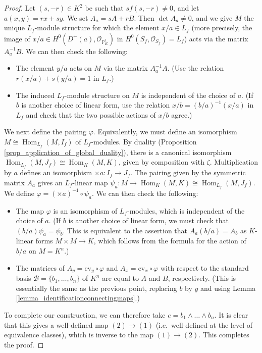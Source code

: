 \documentclass{article} %
\numberwithin{equation}{section}
\DeclareMathOperator{\Hom}{Hom}
\newcommand{\bbP}{\mathbb{P}}
\newcommand{\cO}{\mathcal{O}}
\begin{document}
\begin{proof}
    Let $(s, -r) \in K^2$ be such that $s f(s, -r) \neq 0$, and let $a(x, y) = r x + s y$.  We set $A_a = s A + r B$. Then $\det A_a \neq 0$, and we give $M$ the unique $L_f$-module structure for which the element $x / a \in L_f$ (more precisely, the image of $x / a \in H^0(D^+(a), \cO_{\bbP^1_K})$ in $H^0(S_f, \cO_{S_f}) = L_f$) acts via the matrix $A_a^{-1} B$. We can then check the following:
    \begin{itemize}
     \item The element $y / a$ acts on $M$ via the matrix $A_a^{-1} A$. (Use the relation $r (x / a) + s (y / a) = 1$ in $L_f$.)
        \item The induced $L_f$-module structure on $M$ is independent of the choice of $a$. (If $b$ is another choice of linear form, use the relation $x / b = (b / a)^{-1}(x / a)$ in $L_f$ and check that the two possible actions of $x / b$ agree.)
    \end{itemize}
    We next define the pairing $\varphi$. Equivalently, we must define an isomorphism $M \cong \Hom_{L_f}(M, I_f)$ of $L_f$-modules. By duality (Proposition \ref{prop_application_of_global_duality}), there is a canonical isomorphism $\Hom_{L_f}(M, J_f) \cong \Hom_K(M, K)$, given by composition with $\zeta$. Multiplication by $a$ defines an isomorphism $\times a : I_f \to J_f$. The pairing given by the symmetric matrix $A_a$ gives an $L_f$-linear map $\psi_a : M \to \Hom_K(M, K) \cong \Hom_{L_f}(M, J_f)$. We define $\varphi = (\times a)^{-1} \circ \psi_a$. We can then check the following:
    \begin{itemize}
        \item The map $\varphi$ is an isomorphism of $L_f$-modules, which is independent of the choice of $a$. (If $b$ is another choice of linear form, we must check that $(b / a) \psi_a = \psi_b$. This is equivalent to the assertion that $A_a (b / a) = A_b$ as $K$-linear forms $M \times M \to K$, which follows from the formula for the action of $b / a$ on $M = K^n$.)
        \item The matrices of $A_y = \mathrm{ev}_y \circ \varphi$ and $A_x = \mathrm{ev}_x \circ \varphi$ with respect to the standard basis $\mathcal{B} = \{ b_1, \dots, b_n \}$ of $K^n$ are equal to $A$ and $B$, respectively. (This is essentially the same as the previous point, replacing $b$ by $y$ and using Lemma \ref{lemma_identificationconnectingmaps}.)
    \end{itemize}
    To complete our construction, we can therefore take $e = b_1 \wedge \dots \wedge b_n$. It is clear that this gives a well-defined map $(2) \to (1)$ (i.e.\ well-defined at the level of equivalence classes), which is inverse to the map $(1) \to (2)$. This completes the proof. 
\end{proof}
\end{document}
